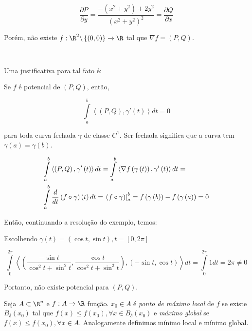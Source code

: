 \documentclass[11pt, oneside, a4paper]{gsm-l}
\begin{document}
\begin{sol}
\[
\frac{{\partial P}}
{{\partial y}} = \frac{{ - \left( {x^2  + y^2 } \right) + 2y^2 }}
{{\left( {x^2  + y^2 } \right)^2 }} = \frac{{\partial Q}}
{{\partial x}}
\]

    Porém, não existe $f:\R^2 \backslash \left\{ {\left( {0,0} \right)} \right\} \to \R$ tal que $\nabla f = \left( {P,Q} \right)$.

\

Uma justificativa para tal fato é:

Se $f$ é potencial de $(P,Q)$, então,

\[
    \int\limits_a^b {\left\langle {\left( {P,Q} \right),\gamma '\left( t \right)} \right\rangle dt}  = 0
\]

    para toda curva fechada $\gamma$ de classe $C^1$. Ser fechada significa que a curva tem $\gamma \left( a \right) = \gamma \left( b \right)$.

\[
\begin{gathered}
  \int\limits_a^b {\left\langle {\left( {P,Q} \right),\gamma '\left( t \right)} \right\rangle dt}  = \int\limits_a^b {\left\langle {\nabla f\left( {\gamma \left( t \right)} \right),\gamma '\left( t \right)} \right\rangle dt}  =  \hfill \\
\int\limits_a^b {\frac{d}
{{dt}}\left( {f \circ \gamma } \right)\left( t \right)dt}  = \left. {\left( {f \circ \gamma } \right)} \right|_a^b  = f\left( {\gamma \left( b \right)} \right) - f\left( {\gamma \left( a \right)} \right) = 0 \hfill \\
\end{gathered}
\]

Então, continuando a resolução do exemplo, temos:

    Escolhendo $\gamma \left( t \right) = \left( {\cos t,\sin t} \right),t = \left[ {0,2\pi } \right]$

\[
\int\limits_0^{2\pi } {\left\langle {\left( {\frac{{ - \sin t}}
{{\cos ^2 t + \sin ^2 t}},\frac{{\cos t}}
{{\cos ^2 t + \sin ^2 t}}} \right),\left( { - \sin t,\cos t} \right)} \right\rangle dt}  = \int\limits_0^{2\pi } {1dt}  = 2\pi  \ne 0
\]

Portanto, não existe potencial para $(P,Q)$.

\end{sol}

\begin{defi} 
  \begin{sloppypar}
    Seja $A \subset \R^n$ e $f:A \to \R$ função. $x_0 \in A$ é \textit{ponto de máximo local} de $f$ se existe $B_\delta  \left( {x_0 } \right)$ tal que ${f\left( x \right) \leqslant f\left( {x_0 } \right),\forall x \in B_\delta  \left( {x_0 } \right)}$ e \textit{máximo global} se $f\left( x \right) \leqslant f\left( {x_0 } \right),\forall x \in A$. Analogamente definimos mínimo local e mínimo global.
  \end{sloppypar}
\end{defi}
\end{document}

